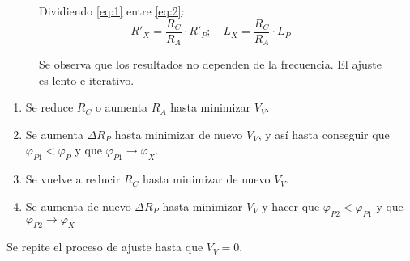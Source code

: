 \begin{figure}[H]
\begin{minipage}{0.4\textwidth}
					
					Dividiendo \eqref{eq:1} entre \eqref{eq:2}:
					\[R'_X = \dfrac{R_C}{R_A}\cdot R'_P; \quad L_X = \dfrac{R_C}{R_A}\cdot L_P\]
					
					
					Se observa que los resultados no dependen de la frecuencia. El ajuste es lento e iterativo.
				\end{minipage}
			\end{figure}

		\newpage	
			\begin{enumerate}
				\item Se reduce $R_C$ o aumenta $R_A$ hasta minimizar $V_V$.
				\item Se aumenta $\Delta R_P$ hasta minimizar de nuevo $V_V$, y así hasta conseguir que $\varphi_{P1} < \varphi_P$ y que $\varphi_{P1}\rightarrow\varphi_X$.
				\item Se vuelve a reducir $R_C$ hasta minimizar de nuevo $V_V$.
				\item Se aumenta de nuevo $\Delta R_P$ hasta minimizar $V_V$ y hacer que $\varphi_{P2} < \varphi_{P1}$ y que $\varphi_{P2}\rightarrow\varphi_X$
			\end{enumerate}
			
			Se repite el proceso de ajuste hasta que $V_V = 0$.	
			
